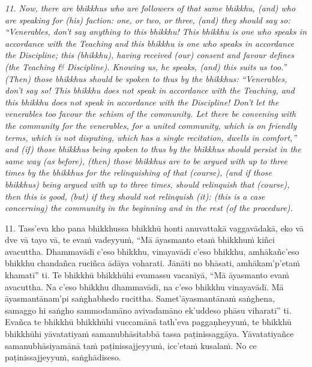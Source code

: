 \documentclass[11pt]{article}
\begin{document}
\begin{paracol}{2}
\begin{column}
{\itshape\footnotesize
11. Now, there are bhikkhus who are followers of that same bhikkhu, (and) who are speaking for (his) faction: one, or two, or three, (and) they should say so: “Venerables, don't say anything to this bhikkhu! This bhikkhu is one who speaks in accordance with the Teaching and this bhikkhu is one who speaks in accordance the Discipline; this (bhikkhu), having received (our) consent and favour defines (the Teaching & Discipline). Knowing us, he speaks, (and) this suits us too.” (Then) those bhikkhus should be spoken to thus by the bhikkhus: “Venerables, don't say so! This bhikkhu does not speak in accordance with the Teaching, and this bhikkhu does not speak in accordance with the Discipline! Don't let the venerables too favour the schism of the community. Let there be convening with the community for the venerables, for a united community, which is on friendly terms, which is not disputing, which has a single recitation, dwells in comfort,” and (if) those bhikkhus being spoken to thus by the bhikkhus should persist in the same way (as before), (then) those bhikkhus are to be argued with up to three times by the bhikkhus for the relinquishing of that (course), (and if those bhikkhus) being argued with up to three times, should relinquish that (course), then this is good, (but) if they should not relinquish (it): (this is a case concerning) the community in the beginning and in the rest (of the procedure).
}
\switchcolumn

\begin{flushleft}
11. Tass’eva kho pana bhikkhussa bhikkhū honti anuvattakā vaggavādakā, eko vā dve vā tayo vā, te evaṁ vadeyyuṁ, “Mā āyasmanto etaṁ bhikkhuṁ kiñci avacuttha. Dhammavādī c’eso bhikkhu, vinayavādī c’eso bhikkhu, amhākañc’eso bhikkhu chandañca ruciñca ādāya voharati. Jānāti no bhāsati, amhākam’p’etaṁ khamatī” ti. Te bhikkhū bhikkhūhi evamassu vacanīyā, “Mā āyasmanto evaṁ avacuttha. Na c’eso bhikkhu dhammavādī, na c’eso bhikkhu vinayavādī. Mā āyasmantānam’pi saṅghabhedo rucittha. Samet’āyasmantānaṁ saṅghena, samaggo hi saṅgho sammodamāno avivadamāno ek’uddeso phāsu viharatī” ti. Evañca te bhikkhū bhikkhūhi vuccamānā tath’eva paggaṇheyyuṁ, te bhikkhū bhikkhūhi yāvatatiyaṁ samanubhāsitabbā tassa paṭinissaggāya. Yāvatatiyañce samanubhāsiyamānā taṁ paṭinissajjeyyuṁ, icc’etaṁ kusalaṁ. No ce paṭinissajjeyyuṁ, saṅghādiseso.
\switchcolumn*
\end{flushleft}


\end{column}
\end{paracol}
\end{document}
